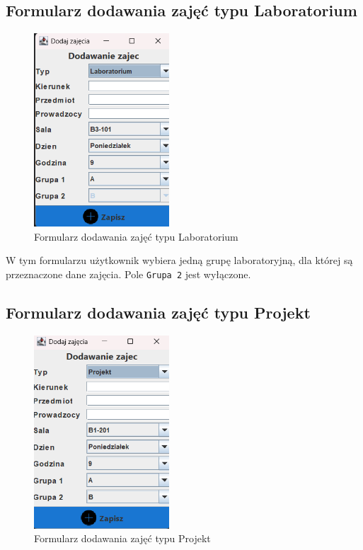 \subsection*{Formularz dodawania zajęć typu Laboratorium}
\begin{figure}[H]
\centering
\includegraphics[width=0.45\textwidth]{figures/workApl/add_lab_panel.png}
\caption{Formularz dodawania zajęć typu Laboratorium}
\label{fig:add_lab}
\end{figure}

W tym formularzu użytkownik wybiera jedną grupę laboratoryjną, dla której są przeznaczone dane zajęcia. Pole \texttt{Grupa 2} jest wyłączone.

\subsection*{Formularz dodawania zajęć typu Projekt}
\begin{figure}[H]
\centering
\includegraphics[width=0.45\textwidth]{figures/workApl/add_projekt_panel.png}
\caption{Formularz dodawania zajęć typu Projekt}
\label{fig:add_projekt}
\end{figure}

